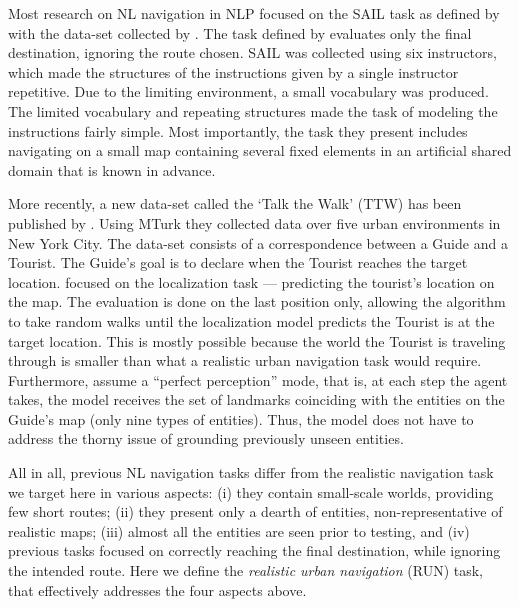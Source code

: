 \documentclass[11pt,a4paper]{article}
\begin{document}
Most research on NL navigation in NLP \citep{macmahon2006walk,chen2011learning,kim2012unsupervised,kim2013adapting,artzi2013weakly,artzi2014learning,mei2015listen,fried2017unified,andreas2015alignment}  focused on the SAIL task as defined by \citet{chen2011learning} with the data-set collected by \citet{macmahon2006walk}. The task defined by \citet{chen2011learning} evaluates only the final destination, ignoring the route chosen. SAIL was collected using  six instructors, which made the structures of the instructions given by a single instructor repetitive. Due to the limiting environment, a small vocabulary was produced. The limited vocabulary and repeating structures made the task of modeling the instructions fairly simple. Most importantly, the task they present includes navigating on a small map containing several fixed elements in an artificial shared domain that is known in advance.  



More recently,  a new data-set called the \enquote*{Talk the Walk} (TTW) has been published by \citet{de2018talk}. Using MTurk they collected data over five urban environments in New York City. The data-set consists of a correspondence between a Guide and a Tourist. The Guide's goal is to declare when the Tourist reaches the target location. \citet{de2018talk} focused on the localization task --- predicting the tourist's location on the map. The evaluation is done on the last position only, allowing the algorithm to take random walks until the localization model predicts the Tourist is at the target location. 
This is mostly possible because the world the Tourist is traveling through is smaller than what a realistic urban navigation task would require. Furthermore, \citet{de2018talk} assume a \enquote{perfect perception} mode, that is, at each step the agent takes, the model receives the set of  landmarks coinciding with the entities on the Guide's map (only nine types of entities). Thus, the model does not have to address the thorny issue of grounding previously unseen entities.
 


All in all, previous NL navigation tasks differ from  the {realistic  navigation task} we target here in various aspects: (i) they contain small-scale worlds, providing few short routes; (ii) they present only a dearth of entities,  non-representative of  realistic maps; (iii) almost all the entities are seen prior to testing, and  (iv) previous tasks focused on correctly reaching the final destination, while ignoring the intended route.
%
%
Here  we define   the {\em realistic urban navigation} (RUN) task, that effectively addresses the four  aspects above.
\end{document}
